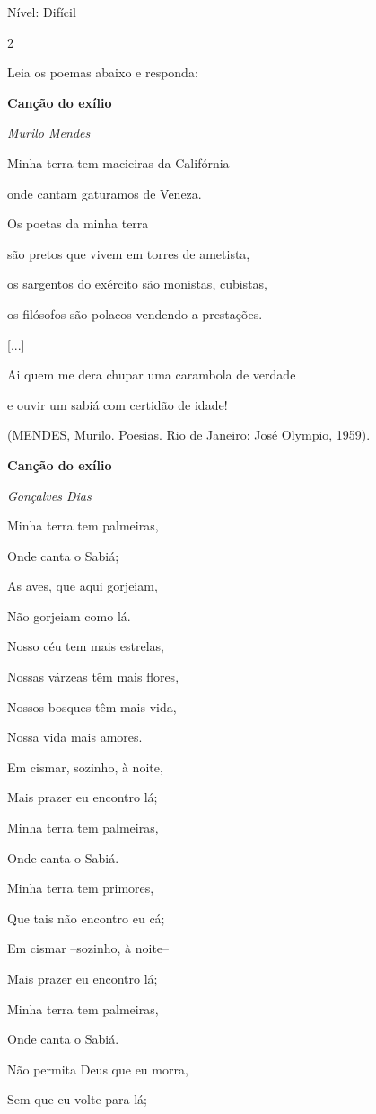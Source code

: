 {Nível: Difícil

\num{2}

Leia os poemas abaixo e responda:

\textbf{Canção do exílio}

\emph{Murilo Mendes}

Minha terra tem macieiras da Califórnia

onde cantam gaturamos de Veneza.

Os poetas da minha terra

são pretos que vivem em torres de ametista,

os sargentos do exército são monistas, cubistas,

os filósofos são polacos vendendo a prestações.

{[}...{]}

Ai quem me dera chupar uma carambola de verdade

e ouvir um sabiá com certidão de idade!

(MENDES, Murilo. Poesias. Rio de Janeiro: José Olympio, 1959).

\textbf{Canção do exílio}

\emph{Gonçalves Dias}

Minha terra tem palmeiras,

Onde canta o Sabiá;

As aves, que aqui gorjeiam,

Não gorjeiam como lá.

Nosso céu tem mais estrelas,

Nossas várzeas têm mais flores,

Nossos bosques têm mais vida,

Nossa vida mais amores.

Em cismar, sozinho, à noite,

Mais prazer eu encontro lá;

Minha terra tem palmeiras,

Onde canta o Sabiá.

Minha terra tem primores,

Que tais não encontro eu cá;

Em cismar --sozinho, à noite--

Mais prazer eu encontro lá;

Minha terra tem palmeiras,

Onde canta o Sabiá.

Não permita Deus que eu morra,

Sem que eu volte para lá;

}
